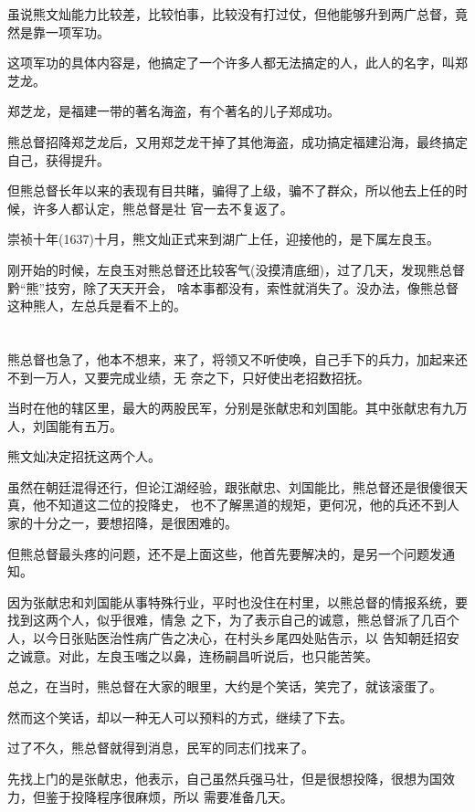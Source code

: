 \documentclass[11pt,a4paper,onecolumn]{article}
\begin{document}
虽说熊文灿能力比较差，比较怕事，比较没有打过仗，但他能够升到两广总督，竟然是靠一项军功。

这项军功的具体内容是，他搞定了一个许多人都无法搞定的人，此人的名字，叫郑芝龙。

郑芝龙，是福建一带的著名海盗，有个著名的儿子\myrule 郑成功。

熊总督招降郑芝龙后，又用郑芝龙干掉了其他海盗，成功搞定福建沿海，最终搞定自己，获得提升。

但熊总督长年以来的表现有目共睹，骗得了上级，骗不了群众，所以他去上任的时候，许多人都认定，熊总督是壮
官一去不复返了。

崇祯十年(1637)十月，熊文灿正式来到湖广上任，迎接他的，是下属左良玉。

刚开始的时候，左良玉对熊总督还比较客气(没摸清底细)，过了几天，发现熊总督黔``熊''技穷，除了天天开会，
啥本事都没有，索性就消失了。没办法，像熊总督这种熊人，左总兵是看不上的。

\section[\thesection]{}

熊总督也急了，他本不想来，来了，将领又不听使唤，自己手下的兵力，加起来还不到一万人，又要完成业绩，无
奈之下，只好使出老招数\myrule 招抚。

当时在他的辖区里，最大的两股民军，分别是张献忠和刘国能。其中张献忠有九万人，刘国能有五万。

熊文灿决定招抚这两个人。

虽然在朝廷混得还行，但论江湖经验，跟张献忠、刘国能比，熊总督还是很傻很天真，他不知道这二位的投降史，
也不了解黑道的规矩，更何况，他的兵还不到人家的十分之一，要想招降，是很困难的。

但熊总督最头疼的问题，还不是上面这些，他首先要解决的，是另一个问题\myrule 发通知。

因为张献忠和刘国能从事特殊行业，平时也没住在村里，以熊总督的情报系统，要找到这两个人，似乎很难，情急
之下，为了表示自己的诚意，熊总督派了几百个人，以今日张贴医治性病广告之决心，在村头乡尾四处贴告示，以
告知朝廷招安之诚意。对此，左良玉嗤之以鼻，连杨嗣昌听说后，也只能苦笑。

总之，在当时，熊总督在大家的眼里，大约是个笑话，笑完了，就该滚蛋了。

然而这个笑话，却以一种无人可以预料的方式，继续了下去。

过了不久，熊总督就得到消息，民军的同志们找来了。

先找上门的是张献忠，他表示，自己虽然兵强马壮，但是很想投降，很想为国效力，但鉴于投降程序很麻烦，所以
需要准备几天。
\end{document}
